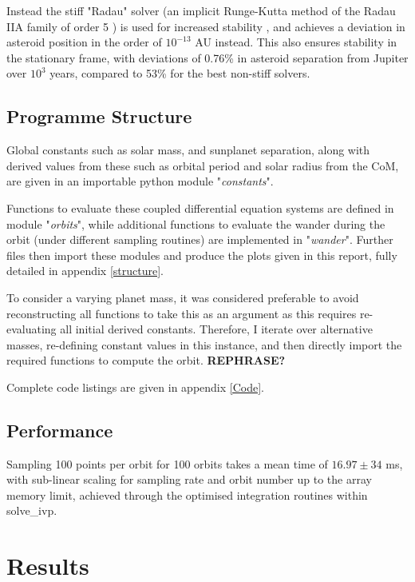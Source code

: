 \documentclass[11pt, a4paper,twocolumn]{article} %
\begin{document}
Instead the stiff "Radau" solver (an implicit Runge-Kutta method of the Radau IIA family of order 5 \cite{Hairer2010}) is used for increased stability \cite{Frank1985}, and achieves a deviation in asteroid position in the order of $ 10^{-13}$ AU instead. This also ensures stability in the stationary frame, with deviations of 0.76\% in asteroid separation from Jupiter over $ 10^{3} $ years, compared to 53\% for the best non-stiff solvers.


\subsection{Programme Structure}
Global constants such as solar mass, and sun\textendash planet separation, along with derived values from these such as orbital period and solar radius from the CoM, are given in an importable python module "\textit{constants}".

Functions to evaluate these coupled differential equation systems are defined in module "\textit{orbits}", while additional functions to evaluate the wander during the orbit (under different sampling routines) are implemented in "\textit{wander}". Further files then import these modules and produce the plots given in this report, fully detailed in appendix \ref{structure}.

To consider a varying planet mass, it was considered preferable to avoid reconstructing all functions to take this as an argument as this requires re-evaluating all initial derived constants. Therefore, I iterate over alternative masses, re-defining constant values in this instance, and then directly import the required functions to compute the orbit. \textbf{REPHRASE?}

Complete code listings are given in appendix \ref{Code}.


\subsection{Performance}
Sampling 100 points per orbit for 100 orbits takes a mean time of $16.97 \pm 34$ \si{\milli\second}, with sub-linear scaling for sampling rate and orbit number up to the array memory limit, achieved through the optimised integration routines within solve\_ivp.


\section{Results}
\end{document}
